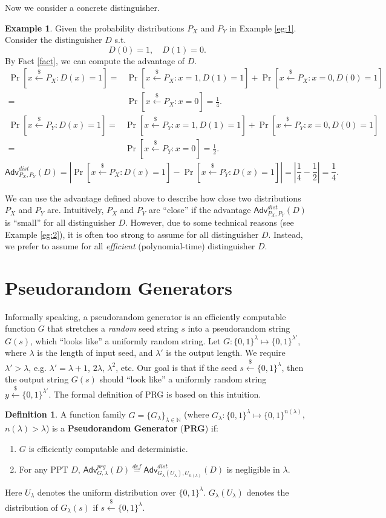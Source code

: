 \documentclass[12pt]{article}
\newcommand{\eqdef}{\stackrel{def}{=}}
\newcommand{\N}{\mathbb{N}}
\newcommand{\bits}{\{0,1\}}
\newcommand{\getsr}{\stackrel{\$}{\gets}}
\newcommand{\Adv}{\textsf{Adv}}
\theoremstyle{definition}
\newtheorem{definition}[theorem]{Definition}
\newtheorem{example}[theorem]{Example}
\begin{document}
Now we consider a concrete distinguisher.
\begin{example}
Given the probability distributions $P_X$ and $P_Y$ in Example \ref{eg:1}. Consider the distinguisher $D$ s.t.
$$D(0)=1, \quad D(1)=0.$$
By Fact \ref{fact}, we can compute the advantage of $D$.
$$
\begin{aligned}
\Pr[x\getsr P_X: D(x)=1] =& \Pr[x\getsr P_X: x=1, D(1)=1] + \Pr[x\getsr P_X: x=0, D(0)=1] \\
=& \Pr[x\getsr P_X: x=0] = \frac{1}{4}.
\end{aligned}
$$
$$
\begin{aligned}
\Pr[x\getsr P_Y: D(x)=1] =& \Pr[x\getsr P_Y: x=1, D(1)=1] + \Pr[x\getsr P_Y: x=0, D(0)=1] \\
=& \Pr[x\getsr P_Y: x=0] =\frac{1}{2}.
\end{aligned}$$
$$\Adv_{P_X,P_Y}^{dist}(D) = \left| \Pr[x\getsr P_X: D(x)=1] - \Pr[x\getsr P_Y: D(x)=1]\right| = \left|\frac{1}{4}-\frac{1}{2}\right| = \frac{1}{4}.$$
\end{example}

We can use the advantage defined above to describe how close two distributions $P_X$ and $P_Y$ are. Intuitively, $P_X$ and $P_Y$ are ``close'' if the advantage $\Adv_{P_X,P_Y}^{dist}(D)$ is ``small'' for all distinguisher $D$. However, due to some technical reasons (see Example \ref{eg:2}), it is often too strong to assume for all distinguisher $D$. Instead, we prefer to assume for all \emph{efficient} (polynomial-time) distinguisher $D$.

\section{Pseudorandom Generators}
Informally speaking, a pseudorandom generator is an efficiently computable function $G$ that stretches a \emph{random} seed string $s$ into a pseudorandom string $G(s)$, which ``looks like'' a uniformly random string. 
Let $G: \bits^\lambda \mapsto \bits^{\lambda'}$, where $\lambda$ is the length of input seed, and $\lambda'$ is the output length. We require $\lambda' > \lambda$, e.g. $\lambda' = \lambda+1$, $2\lambda$, $\lambda^2$, etc. Our goal is that if the seed $s\getsr \bits^\lambda$, then the output string $G(s)$ should ``look like'' a uniformly random string $y\getsr\bits^{\lambda'}$. The formal definition of PRG is based on this intuition.
\begin{definition}
A function family $G = \{G_\lambda\}_{\lambda\in\N}$ (where $G_\lambda : \bits^\lambda \mapsto \bits^{n(\lambda)}$, $n(\lambda)>\lambda$) is a {\bf Pseudorandom Generator} ({\bf PRG}) if:
\begin{enumerate}
\item $G$ is efficiently computable and deterministic.
\item For any PPT $D$, $\Adv_{G,\lambda}^{prg}(D) \eqdef \Adv_{G_\lambda(U_\lambda),U_{n(\lambda)}}^{dist}(D)$ is negligible in $\lambda$.
\end{enumerate}
Here $U_\lambda$ denotes the uniform distribution over $\bits^\lambda$. $G_\lambda(U_\lambda)$ denotes the distribution of $G_\lambda(s)$ if $s\getsr\bits^\lambda$.
\end{definition}
\end{document}
